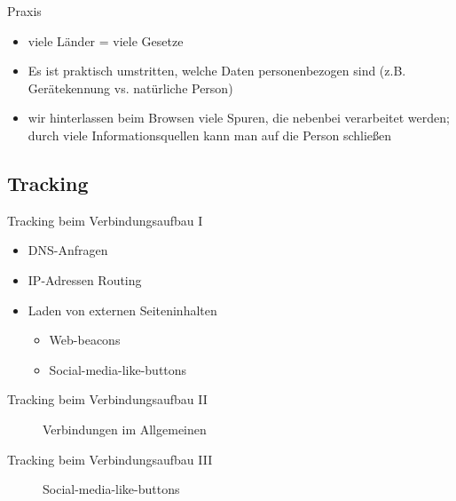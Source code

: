 \documentclass[utf8]{beamer}
\begin{document}
	\begin{frame}{Praxis}
		\begin{itemize}
			\item viele Länder = viele Gesetze
			\item Es ist praktisch umstritten, welche Daten personenbezogen sind (z.B. Gerätekennung vs. natürliche Person)
			\item wir hinterlassen beim Browsen viele Spuren, die nebenbei verarbeitet werden; durch viele Informationsquellen kann man auf die Person schließen
		\end{itemize}
	\end{frame}
	
	\subsection{Tracking}
	\begin{frame}{Tracking beim Verbindungsaufbau I}
		\begin{itemize}
			\item DNS-Anfragen
			\item IP-Adressen Routing
			\item Laden von externen Seiteninhalten
			\begin{itemize}
				\item Web-beacons
				\item Social-media-like-buttons
			\end{itemize}
		\end{itemize}
	\end{frame}

	\begin{frame}{Tracking beim Verbindungsaufbau II}
		\begin{figure}[H]
			\label{fig:trackography}
			\caption{Verbindungen im Allgemeinen}
		\end{figure}
	\end{frame}

	\begin{frame}{Tracking beim Verbindungsaufbau III}
		\begin{figure}[H]
			\label{fig:webbeacons}
			\caption{Social-media-like-buttons}
		\end{figure}
	\end{frame}
\end{document}

